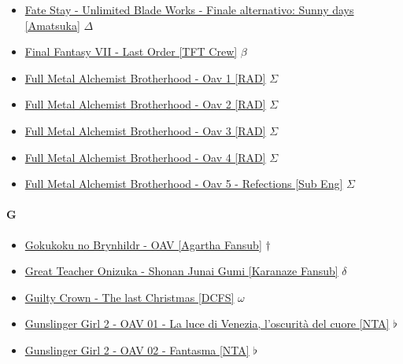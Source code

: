 \begin{itemize}
				\item \href{https://mega.nz/#!jQ5gybKA!htFJWxySBMkI3TpKgqhnw_Hg6j1RxnTrxj-EiQW_b4M} {Fate Stay - Unlimited Blade Works - Finale alternativo: Sunny days [Amatsuka]}  $\Delta$   \\ 
				\item \href{https://mega.nz/#!noxgQDIT!K0rkl0VO1eJ-id92CaGVfVEObWJeqPVYY5VBfFFOQUo} {Final Fantasy VII - Last Order [TFT Crew]}  $\beta$   \\ 
				\item \href{https://mega.nz/#!ljpgWQTb!NQXMZ_yOP4Nl1Tcs2zT9cL4mcHpyfIwwBegIOud4_Qs} {Full Metal Alchemist Brotherhood - Oav 1 [RAD]}  $\Sigma$   \\
				\item \href{https://mega.nz/#!Yup3ATpa!0zuzEd8xS1tmvPWNwKXx09n4UgZxmsr4iBT1eM0NwRQ} {Full Metal Alchemist Brotherhood - Oav 2 [RAD]}  $\Sigma$   \\
				\item \href{https://mega.nz/#!w7YzGJhQ!hpBZOKiX3Zofj1bN0-29VuF2MjZiE-mUAWB3U6yu2cM} {Full Metal Alchemist Brotherhood - Oav 3 [RAD]}  $\Sigma$   \\
				\item \href{https://mega.nz/#!RqIEiLya!-8oKDjvE6XsxeOZRjD5uSZIWjXfqfuAXMN4wvMc5jWY} {Full Metal Alchemist Brotherhood - Oav 4 [RAD]}  $\Sigma$   \\
				\item \href{https://mega.nz/#!8yRTASAS!1oAt4rFgygmDwt__7T7SxyMs12AftM8G-BI2TmJ_JoA} {Full Metal Alchemist Brotherhood - Oav 5 - Refections [Sub Eng]}  $\Sigma$   \\
		
			\end{itemize}
	
	
		\paragraph{G} \hypertarget{OG}{}
			\begin{itemize}
				
				\item \href{https://mega.nz/#!KeBlCQaS!Hi0go1IFYoSNzVwA-zvtkK5Hf_tB4Zv5rPUzXgoxcaQ} {Gokukoku no Brynhildr - OAV [Agartha Fansub]}   $\dag$  \\ 
				\item \href{https://mega.nz/#F!xBgCwLQI!NhK6fH7MbL10j8IzPq5FHg} {Great Teacher Onizuka - Shonan Junai Gumi [Karanaze Fansub]}   $\delta$  \\ 
				\item \href{https://mega.nz/#!MQlAxDaa!anHw_jrBUVrYJjZV13CjzqiMMXFmLW_MfilrDGNUtkw} {Guilty Crown - The last Christmas [DCFS]}   $\omega$  \\ 
				\item \href{https://mega.nz/#!s3oAhLgI!UuyjrNsxmsEXcbl_Piv8QACQtLNK2yyhbKCSslbMpsg} {Gunslinger Girl 2 - OAV 01 - La luce di Venezia, l'oscurità del cuore [NTA]}   $\flat$  \\ 
				\item \href{https://mega.nz/#!YzQW2KLZ!jHLYdYF9K78Kdf0Tt3nWAsk5NkOu6pg7phfFWz3wC3U} {Gunslinger Girl 2 - OAV 02 - Fantasma [NTA]}   $\flat$  \\ 
			\end{itemize}
		

